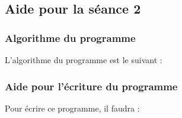 





\subsection{Aide pour la séance 2}\label{aide_seanceScratch2}

\subsubsection{Algorithme du programme}  

L'algorithme du programme est le suivant :



\subsubsection{Aide pour l'écriture du programme}  

Pour écrire ce programme, il faudra :

